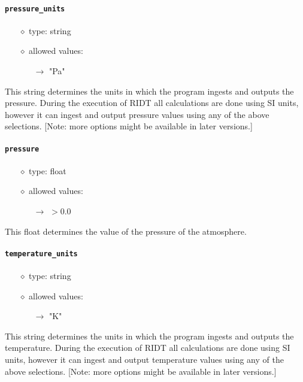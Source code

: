 \documentclass[]{article}
\def\code#1{\texttt{#1}}
\begin{document}
\paragraph{\code{pressure\_units}}\label{sec:pressureunits}
\begin{itemize}
    \item[$\diamond$] type: string 
    \item[$\diamond$] allowed values:
    \begin{itemize}
        \item[$\rightarrow$] "Pa"
    \end{itemize}
\end{itemize}
This string determines the units in which the program ingests and outputs the
pressure. During the execution of RIDT all calculations are done using SI units,
however it can ingest and output pressure values using any of the above
selections. [Note: more options might be available in later versions.]

\paragraph{\code{pressure}}\label{sec:pressure}
\begin{itemize}
    \item[$\diamond$] type: float 
    \item[$\diamond$] allowed values:
    \begin{itemize}
        \item[$\rightarrow$] $>0.0$ 
    \end{itemize}
\end{itemize}
This float determines the value of the pressure of the atmosphere.

\paragraph{\code{temperature\_units}}\label{sec:temperatureunits}
\begin{itemize}
    \item[$\diamond$] type: string 
    \item[$\diamond$] allowed values:
    \begin{itemize}
        \item[$\rightarrow$] "K"
    \end{itemize}
\end{itemize}
This string determines the units in which the program ingests and outputs the
temperature. During the execution of RIDT all calculations are done using SI units,
however it can ingest and output temperature values using any of the above
selections. [Note: more options might be available in later versions.]
\end{document}
